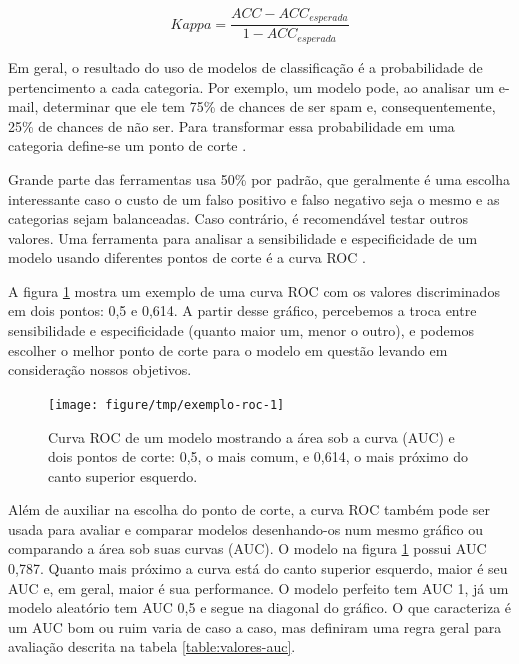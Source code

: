 \documentclass[a4paper,titlepage]{ppgi}\usepackage[]{graphicx}\usepackage[]{color}
\newenvironment{knitrout}{}{} %
\begin{document}
\begin{equation}
\label{eq:kappa}
Kappa = \frac{ACC - ACC_{esperada}}{1 - ACC_{esperada}}
\end{equation}

Em geral, o resultado do uso de modelos de classificação é a probabilidade de
pertencimento a cada categoria. Por exemplo, um modelo pode, ao analisar um
e-mail, determinar que ele tem 75\% de chances de ser spam e, consequentemente,
25\% de chances de não ser. Para transformar essa probabilidade em uma
categoria define-se um ponto de corte \cite{Kuhn2013}.

Grande parte das ferramentas usa 50\% por padrão, que geralmente é uma escolha
interessante caso o custo de um falso positivo e falso negativo seja o mesmo e
as categorias sejam balanceadas. Caso contrário, é recomendável testar outros
valores. Uma ferramenta para analisar a sensibilidade e especificidade de um
modelo usando diferentes pontos de corte é a curva \gls{ROC}
\cite{Altman1994,Brown2006,Fawcett2006}.

A figura \ref{fig:exemplo-roc} mostra um exemplo de uma curva \gls{ROC} com os
valores discriminados em dois pontos: 0,5 e 0,614. A partir desse gráfico,
percebemos a troca entre sensibilidade e especificidade (quanto maior um, menor
o outro), e podemos escolher o melhor ponto de corte para o modelo em questão
levando em consideração nossos objetivos.

\begin{knitrout}
\color{fgcolor}\begin{figure}
\texttt{[image: figure/tmp/exemplo-roc-1]} \caption[Curva ROC de um modelo mostrando a área sob a curva (AUC) e dois pontos de corte]{Curva ROC de um modelo mostrando a área sob a curva (AUC) e dois pontos de corte: 0,5, o mais comum, e 0,614, o mais próximo do canto superior esquerdo.}\label{fig:exemplo-roc}
\end{figure}


\end{knitrout}

Além de auxiliar na escolha do ponto de corte, a curva \gls{ROC} também pode
ser usada para avaliar e comparar modelos desenhando-os num mesmo gráfico ou
comparando a área sob suas curvas (\acrshort{AUC}). O modelo na figura
\ref{fig:exemplo-roc} possui \acrshort{AUC} 0,787. Quanto mais próximo a curva está
do canto superior esquerdo, maior é seu \acrshort{AUC} e, em geral, maior é sua
performance.  O modelo perfeito tem \acrshort{AUC} 1, já um modelo aleatório
tem \acrshort{AUC} 0,5 e segue na diagonal do gráfico. O que caracteriza é um
\acrshort{AUC} bom ou ruim varia de caso a caso, mas 
definiram uma regra geral para avaliação descrita na tabela
\ref{table:valores-auc}.
\end{document}
